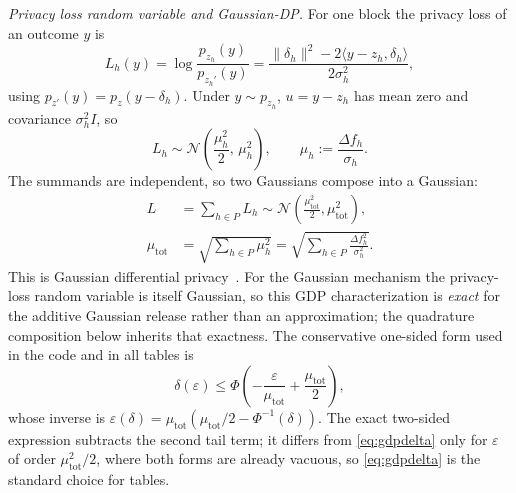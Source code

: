 \documentclass[10pt,twocolumn,letterpaper]{article}
\theoremstyle{plain}
\theoremstyle{definition}
\begin{document}
\emph{Privacy loss random variable and Gaussian-DP.} For one block the privacy
loss of an outcome $y$ is
\begin{equation}
L_h(y)=\log\frac{p_{z_h}(y)}{p_{z_h'}(y)}
=\frac{\|\delta_h\|^{2}-2\langle y-z_h,\delta_h\rangle}{2\sigma_h^{2}},
\label{eq:loss}
\end{equation}
using $p_{z'}(y)=p_z(y-\delta_h)$. Under $y\sim p_{z_h}$,
$u=y-z_h$ has mean zero and covariance $\sigma_h^2I$, so
\begin{equation}
L_h\sim\mathcal{N}\!\left(\frac{\mu_h^{2}}{2},\,\mu_h^{2}\right),
\qquad \mu_h:=\frac{\Delta f_h}{\sigma_h}.
\label{eq:gdpblock}
\end{equation}
The summands are independent, so two Gaussians compose into a Gaussian:
\begin{equation}\begin{split}
L&=\sum_{h\in P}L_h
\sim\mathcal{N}\!\left(\frac{\mu_{\mathrm{tot}}^{2}}{2},
\mu_{\mathrm{tot}}^{2}\right),\\
\mu_{\mathrm{tot}}&=\sqrt{\sum_{h\in P}\mu_h^{2}}
=\sqrt{\sum_{h\in P}\frac{\Delta f_h^{2}}{\sigma_h^{2}}}.
\end{split}\label{eq:gdpsum}
\end{equation}
This is Gaussian differential privacy~\cite{dong2022gdp}. For the Gaussian
mechanism the privacy-loss random variable is itself Gaussian, so this GDP
characterization is \emph{exact} for the additive Gaussian release rather than
an approximation; the quadrature composition below inherits that exactness.
The conservative
one-sided form used in the code and in all tables is
\begin{equation}
\delta(\varepsilon)\le\Phi\!\left(-\frac{\varepsilon}{\mu_{\mathrm{tot}}}
+\frac{\mu_{\mathrm{tot}}}{2}\right),
\label{eq:gdpdelta}
\end{equation}
whose inverse is
$\varepsilon(\delta)=\mu_{\mathrm{tot}}(\mu_{\mathrm{tot}}/2-\Phi^{-1}(\delta))$.
The exact two-sided expression subtracts the second tail term; it differs
from \eqref{eq:gdpdelta} only for $\varepsilon$ of order
$\mu_{\mathrm{tot}}^2/2$, where both forms are already vacuous, so
\eqref{eq:gdpdelta} is the standard choice for tables.
\end{document}
